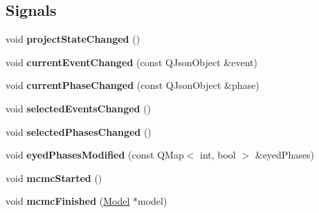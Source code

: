 \subsection*{Signals}
\begin{DoxyCompactItemize}
\item 
\hypertarget{class_project_addc8098d179c7a4510228ba807befdce}{void {\bfseries project\-State\-Changed} ()}\label{class_project_addc8098d179c7a4510228ba807befdce}

\item 
\hypertarget{class_project_a5d47078da7f84c9fc66a7f5a0f4050c4}{void {\bfseries current\-Event\-Changed} (const Q\-Json\-Object \&event)}\label{class_project_a5d47078da7f84c9fc66a7f5a0f4050c4}

\item 
\hypertarget{class_project_aa15c897cb298c873d3f5a5157488aca7}{void {\bfseries current\-Phase\-Changed} (const Q\-Json\-Object \&phase)}\label{class_project_aa15c897cb298c873d3f5a5157488aca7}

\item 
\hypertarget{class_project_acaa940912ff83d8616d422cac82633b3}{void {\bfseries selected\-Events\-Changed} ()}\label{class_project_acaa940912ff83d8616d422cac82633b3}

\item 
\hypertarget{class_project_a584ae4193c824b2c672294585e599cb6}{void {\bfseries selected\-Phases\-Changed} ()}\label{class_project_a584ae4193c824b2c672294585e599cb6}

\item 
\hypertarget{class_project_a918c24567c8f81199382b1fc3394b99b}{void {\bfseries eyed\-Phases\-Modified} (const Q\-Map$<$ int, bool $>$ \&eyed\-Phases)}\label{class_project_a918c24567c8f81199382b1fc3394b99b}

\item 
\hypertarget{class_project_aa415f14b7319c39758fde5842c887c84}{void {\bfseries mcmc\-Started} ()}\label{class_project_aa415f14b7319c39758fde5842c887c84}

\item 
\hypertarget{class_project_a08d262b578c422fd1f4f45859e0ef455}{void {\bfseries mcmc\-Finished} (\hyperlink{class_model}{Model} $\ast$model)}\label{class_project_a08d262b578c422fd1f4f45859e0ef455}

\end{DoxyCompactItemize}
